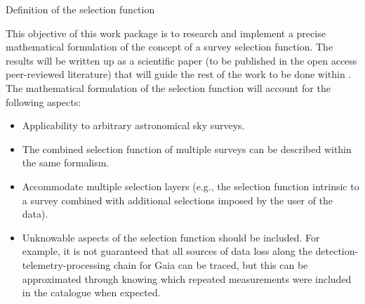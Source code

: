 \begin{workpackage}{Definition of the selection function}
  \label{wp:selfundefinition}
  
  \makewptable %

  \begin{wpobjectives}
    This objective of this work package is to research and implement a precise mathematical formulation of the concept of a survey selection function. The results will be written up as a scientific paper (to be published in the open access peer-reviewed literature) that will guide the rest of the work to be done within {\acro}.  The mathematical formulation of the selection function will account for the following aspects:
    \begin{itemize}
        \item Applicability to arbitrary astronomical sky surveys.
        \item The combined selection function of multiple surveys can be described within the same formalism.
        \item Accommodate multiple selection layers (e.g., the selection function intrinsic to a survey combined with additional selections imposed by the user of the data).
        \item Unknowable aspects of the selection function should be included. For example, it is not guaranteed that all sources of data loss along the detection-telemetry-processing chain for Gaia can be traced, but this can be approximated through knowing which repeated measurements were included in the catalogue when expected.
    \end{itemize}
  \end{wpobjectives}

  \begin{wpdescription}

\end{wpdescription}
\end{workpackage}
